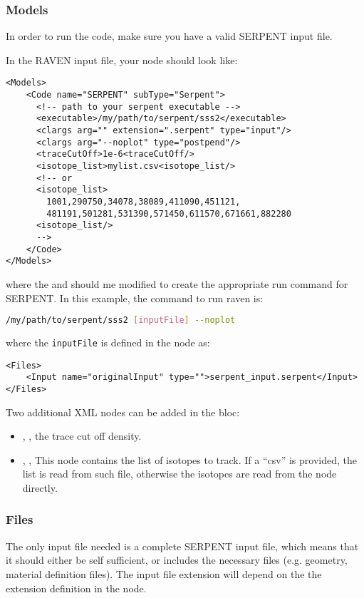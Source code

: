 \subsubsection{Models}
In order to run the code, make sure you have a valid SERPENT input file.

In the RAVEN input file, your  node should look like:
\begin{lstlisting}[style=XML]
<Models>
    <Code name="SERPENT" subType="Serpent">
      <!-- path to your serpent executable -->
      <executable>/my/path/to/serpent/sss2</executable>
      <clargs arg="" extension=".serpent" type="input"/>
      <clargs arg="--noplot" type="postpend"/>
      <traceCutOff>1e-6<traceCutOff/>
      <isotope_list>mylist.csv<isotope_list/>
      <!-- or 
      <isotope_list>
        1001,290750,34078,38089,411090,451121,
        481191,501281,531390,571450,611570,671661,882280
      <isotope_list/>
      -->
    </Code>
</Models>
\end{lstlisting}
where the  and  should me modified
to create the appropriate run command for SERPENT. In this example, the command
to run raven is:
\begin{lstlisting}[language=bash]
/my/path/to/serpent/sss2 [inputFile] --noplot
\end{lstlisting}
where the \texttt{inputFile} is defined in the  node as:
\begin{lstlisting}[style=XML]
<Files>
    <Input name="originalInput" type="">serpent_input.serpent</Input>
</Files>
\end{lstlisting}

Two additional XML nodes can be added in the bloc:

\begin{itemize}
   \item {}, ,  the trace cut off density.
   \item {}, , This node contains the list
   of isotopes to track. If a ``csv'' is provided, the list is read from such file, otherwise the isotopes are read from the node
   directly.
\end{itemize}

\subsubsection{Files}
The only input file needed is a complete SERPENT input file,
which means that it should either be self sufficient, or includes
the necessary files (e.g. geometry, material definition files).
The input file extension will depend on the the extension definition
in the  node.

